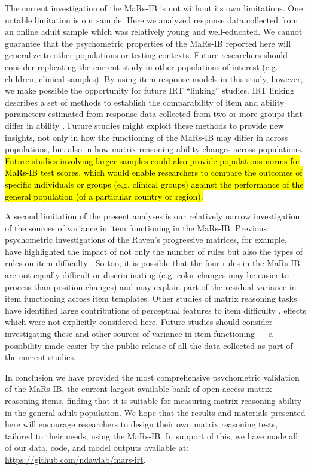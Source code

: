 \documentclass[a4paper,man,natbib]{apa6}
\begin{document}
The current investigation of the MaRs-IB is not without its own limitations. One notable limitation is our sample. Here we analyzed response data collected from an online adult sample which was relatively young and well-educated. We cannot guarantee that the psychometric properties of the MaRs-IB reported here will generalize to other populations or testing contexts. Future researchers should consider replicating the current study in other populations of interest (e.g. children, clinical samples). By using item response models in this study, however, we make possible the opportunity for future IRT ``linking'' studies. IRT linking describes a set of methods to establish the comparability of item and ability parameters estimated from response data collected from two or more groups that differ in ability \citep{lee2018irt}. Future studies might exploit these methods to provide new insights, not only in how the functioning of the MaRs-IB may differ in across populations, but also in how matrix reasoning ability changes across populations. \hl{Future studies involving larger samples could also provide populations norms for MaRs-IB test scores, which would enable researchers to compare the outcomes of specific individuals or groups (e.g. clinical groups) against the performance of the general population (of a particular country or region).}

A second limitation of the present analyses is our relatively narrow investigation of the sources of variance in item functioning in the MaRs-IB. Previous psychometric investigations of the Raven's progressive matrices, for example, have highlighted the impact of not only the number of rules but also the types of rules on item difficulty \citep{carpenter1990one, embretson1998cognitive}. So too, it is possible that the four rules in the MaRs-IB are not equally difficult or discriminating (e.g. color changes may be easier to process than position changes) and may explain part of the residual variance in item functioning across item templates. Other studies of matrix reasoning tasks have identified large contributions of perceptual features to item difficulty \citep{primi2001complexity, primi2014developing}, effects which were not explicitly considered here. Future studies should consider investigating these and other sources of variance in item functioning --- a possibility made easier by the public release of all the data collected as part of the current studies.

In conclusion we have provided the most comprehensive psychometric validation of the MaRs-IB, the current largest available bank of open access matrix reasoning items, finding that it is suitable for measuring matrix reasoning ability in the general adult population. We hope that the results and materials presented here will encourage researchers to design their own matrix reasoning tests, tailored to their needs, using the MaRs-IB. In support of this, we have made all of our data, code, and model outputs available at: \url{https://github.com/ndawlab/mars-irt}.
\end{document}
